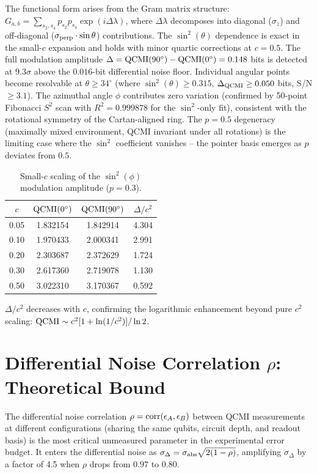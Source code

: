 \documentclass[aps,prl,showpacs]{revtex4-2}
\begin{document}
The functional form arises from the Gram matrix structure: $G_{a,b} = \sum_{s_2,s_4} p_{s_2} p_{s_4} \exp(i\Delta\lambda)$, where $\Delta\lambda$ decomposes into diagonal ($\sigma_z$) and off-diagonal ($\sigma_{\rm perp}\cdot\sin\theta$) contributions. The $\sin^2(\theta)$ dependence is exact in the small-$c$ expansion and holds with minor quartic corrections at $c=0.5$. The full modulation amplitude $\Delta = {\rm QCMI}(90^\circ) - {\rm QCMI}(0^\circ) = 0.148$ bits is detected at $9.3\sigma$ above the $0.016$-bit differential noise floor. Individual angular points become resolvable at $\theta \geq 34^\circ$ (where $\sin^2(\theta) \geq 0.315$, $\Delta_{\rm QCMI} \geq 0.050$ bits, S/N $\geq 3.1$). The azimuthal angle $\phi$ contributes zero variation (confirmed by 50-point Fibonacci $S^2$ scan with $R^2=0.999878$ for the $\sin^2$-only fit), consistent with the rotational symmetry of the Cartan-aligned ring. The $p=0.5$ degeneracy (maximally mixed environment, QCMI invariant under all rotations) is the limiting case where the $\sin^2$ coefficient vanishes -- the pointer basis emerges as $p$ deviates from $0.5$.

\begin{table}[h]
\caption{Small-$c$ scaling of the $\sin^2(\phi)$ modulation amplitude ($p=0.3$).}
\begin{tabular}{c|c|c|c}
\hline
$c$ & ${\rm QCMI}(0^\circ)$ & ${\rm QCMI}(90^\circ)$ & $\Delta/c^2$ \\
\hline
0.05 & 1.832154 & 1.842914 & 4.304 \\
0.10 & 1.970433 & 2.000341 & 2.991 \\
0.20 & 2.303687 & 2.372629 & 1.724 \\
0.30 & 2.617360 & 2.719078 & 1.130 \\
0.50 & 3.022310 & 3.170367 & 0.592 \\
\hline
\end{tabular}
$\Delta/c^2$ decreases with $c$, confirming the logarithmic enhancement beyond pure $c^2$ scaling: ${\rm QCMI} \sim c^2[1+\ln(1/c^2)]/\ln 2$.
\end{table}


\section{Differential Noise Correlation $\rho$: Theoretical Bound}

The differential noise correlation $\rho = {\rm corr}(\epsilon_A, \epsilon_B)$ between QCMI measurements at different configurations (sharing the same qubits, circuit depth, and readout basis) is the most critical unmeasured parameter in the experimental error budget. It enters the differential noise as $\sigma_\Delta = \sigma_{\rm abs}\sqrt{2(1-\rho)}$, amplifying $\sigma_\Delta$ by a factor of 4.5 when $\rho$ drops from $0.97$ to $0.80$.
\end{document}
